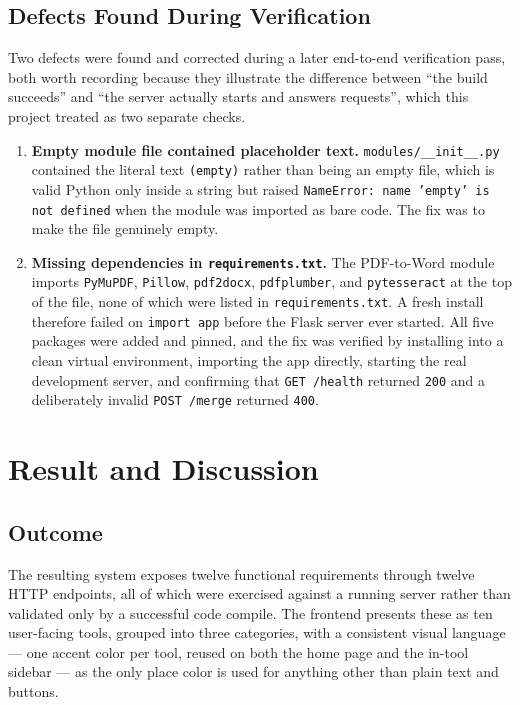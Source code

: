 \documentclass[12pt,a4paper]{report}
\begin{document}
\section{Defects Found During Verification}
Two defects were found and corrected during a later end-to-end verification pass, both worth
recording because they illustrate the difference between ``the build succeeds'' and ``the server
actually starts and answers requests'', which this project treated as two separate checks.

\begin{enumerate}[label=\arabic*.]
  \item \textbf{Empty module file contained placeholder text.} \texttt{modules/\_\_init\_\_.py}
        contained the literal text \texttt{(empty)} rather than being an empty file, which is
        valid Python only inside a string but raised \texttt{NameError: name 'empty' is not
        defined} when the module was imported as bare code. The fix was to make the file
        genuinely empty.
  \item \textbf{Missing dependencies in \texttt{requirements.txt}.} The PDF-to-Word module
        imports \texttt{PyMuPDF}, \texttt{Pillow}, \texttt{pdf2docx}, \texttt{pdfplumber}, and
        \texttt{pytesseract} at the top of the file, none of which were listed in
        \texttt{requirements.txt}. A fresh install therefore failed on \texttt{import app} before
        the Flask server ever started. All five packages were added and pinned, and the fix was
        verified by installing into a clean virtual environment, importing the app directly,
        starting the real development server, and confirming that \texttt{GET /health} returned
        \texttt{200} and a deliberately invalid \texttt{POST /merge} returned \texttt{400}.
\end{enumerate}

\chapter{Result and Discussion}

\section{Outcome}
The resulting system exposes twelve functional requirements through twelve HTTP endpoints, all of
which were exercised against a running server rather than validated only by a successful code
compile. The frontend presents these as ten user-facing tools, grouped into three categories, with
a consistent visual language --- one accent color per tool, reused on both the home page and the
in-tool sidebar --- as the only place color is used for anything other than plain text and
buttons.
\end{document}

